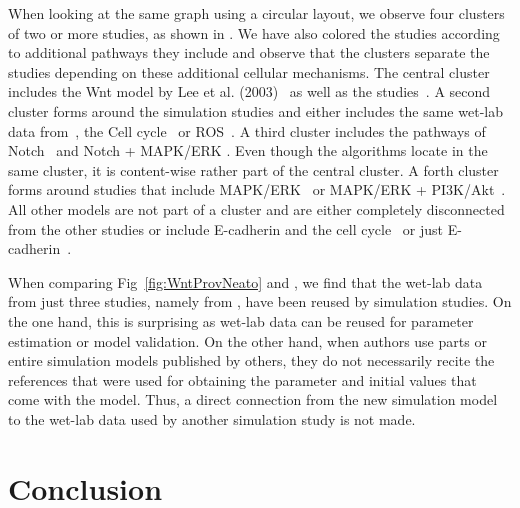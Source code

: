 \documentclass[10pt,letterpaper]{article}
\newcommand{\wnt}{Wnt}
\newcommand{\lee}{Lee et al. (2003)}
\begin{document}
When looking at the same graph using a circular layout, we observe four clusters of two or more studies, as shown in .
We have also colored the studies according to additional pathways they include and observe that the clusters separate the studies depending on these additional cellular mechanisms.
The central cluster includes the \wnt{} model by \lee{}~\cite{Lee2003} as well as the studies~\cite{Cho2006, vanLeeuwen2007, Wawra2007, Mirams2010}.
A second cluster forms around the simulation studies \cite{Mazemondet2012, Kogan2012, Haack2015, Haack2020, Staehlke2020} and either includes the same wet-lab data from~\cite{Bafico2001, Hannoush2008}, the Cell cycle~\cite{Mazemondet2012} or ROS~\cite{Haack2015, Staehlke2020}.
A third cluster includes the pathways of Notch~\cite{Rodriguez2007, Wang2013} and Notch + MAPK/ERK \cite{Goldbeter2008}. Even though the algorithms locate \cite{Kruger2004} in the same cluster, it is content-wise rather part of the central cluster.
A forth cluster forms around studies that include MAPK/ERK~\cite{Kim2007} or MAPK/ERK + PI3K/Akt~\cite{Padala2017}.
All other models are not part of a cluster and are either completely disconnected from the other studies \cite{Sick2006} or include E-cadherin and the cell cycle~\cite{vanLeeuwen2009} or just E-cadherin~\cite{Chen2014}.

When comparing Fig~\ref{fig:WntProvNeato} and , we find that the wet-lab data from just three studies, namely from \cite{Bafico2001, Hannoush2008, Dequeant2006}, have been reused by simulation studies.
On the one hand, this is surprising as wet-lab data can be reused for parameter estimation or model validation.
On the other hand, when authors use parts or entire simulation models published by others, they do not necessarily recite the references that were used for obtaining the parameter and initial values that come with the model.
Thus, a direct connection from the new simulation model to the wet-lab data used by another simulation study is not made.



\section*{Conclusion}
\end{document}
